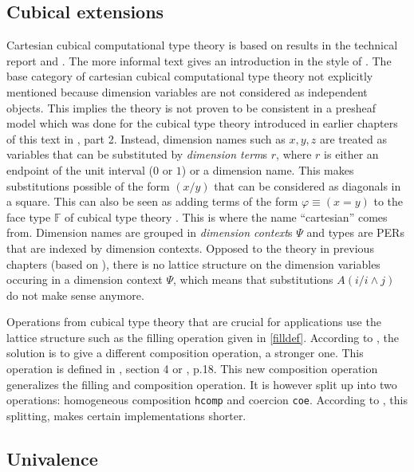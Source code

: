 \documentclass[12pt,a4paper,twoside,xetex]{book} %
\newcommand{\keyword}[1]{\emph{#1}\index{#1}}
\begin{document}
\subsection{Cubical extensions}

Cartesian cubical computational type theory is based on results in the technical 
report \cite{AnHoHa17} and \cite{Angiuli2018}. The more informal text 
\cite{Bentzen2018Jun} gives an introduction in the style of 
\cite{Voevodsky2013}. The base category of cartesian cubical computational type 
theory not explicitly mentioned because dimension variables are not considered 
as independent objects. This implies the theory is not proven to be consistent 
in a presheaf model which was done for the cubical type theory introduced in 
earlier chapters of this text in \cite{Huber2016}, part 2. Instead, dimension 
names such as $x,y,z$ are treated as variables that can be substituted 
by \keyword{dimension term}s $r$, where $r$ is either an endpoint of the unit 
interval ($0$ or $1$) or a dimension name. This makes substitutions possible of 
the form $(x/y)$ that can be considered as diagonals in a square. This can also 
be seen as adding terms of the form $\varphi \equiv (x = y)$ to the face type 
$\mathbb{F}$ of cubical type theory \cite{Huber2016}. This is where the name 
``cartesian'' comes from. Dimension names are grouped in \keyword{dimension 
context}s $\Psi$ and types are PERs that are indexed by dimension contexts. 
Opposed to the theory in previous chapters (based on \cite{Huber2016}), there is 
no lattice structure on the dimension variables occuring in a dimension context 
$\Psi$, which means that substitutions  $A(i/i\wedge j)$ do not make sense 
anymore.

Operations from cubical type theory that are crucial for applications use the 
lattice structure such as the filling operation given in \cref{filldef}. 
According to \cite{Moertberg2018Bonn}, the solution is to give a different 
composition operation, a stronger one. This operation is defined in 
\cite{Angiuli2018}, section 4 or \cite{Moertberg2018Bonn}, p.18. This new 
composition operation generalizes the filling and composition operation. It is 
however split up into two operations: homogeneous composition \texttt{hcomp} and 
coercion \texttt{coe}. According to \cite{Moertberg2018Bonn}, this splitting, 
makes certain implementations shorter.

\subsection{Univalence}\label{compuniv}
\end{document}
